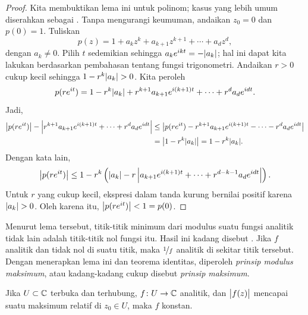 \begin{proof}
Kita membuktikan lema ini untuk polinom; kasus yang lebih umum diserahkan sebagai
.
Tanpa mengurangi keumuman, andaikan $z_0 = 0$ dan $p(0) = 1$.  Tuliskan
\begin{equation*}
p(z) = 1+a_kz^k + a_{k+1}z^{k+1} + \cdots + a_d z^d ,
\end{equation*}
dengan $a_k \neq 0$.  Pilih $t$ sedemikian sehingga $a_k e^{ikt} = -\lvert {a_k} \rvert$; hal
ini dapat kita lakukan berdasarkan pembahasan tentang fungsi trigonometri.  Andaikan
$r > 0$ cukup kecil sehingga
$1-r^k \lvert {a_k} \rvert > 0$.  Kita peroleh
\begin{equation*}
p(r e^{it}) =
1-r^k \lvert {a_k} \rvert + r^{k+1}a_{k+1}e^{i(k+1)t} + \cdots + r^{d}a_{d}e^{idt} .
\end{equation*}
Jadi,
\begin{equation*}
\begin{split}
\bigl\lvert {
p(r e^{it}) } \bigr\rvert - \left\lvert {
r^{k+1}a_{k+1}e^{i(k+1)t} + \cdots + r^{d}a_{d}e^{idt}
} \right\rvert
&
\leq
\bigl\lvert {
p(r e^{it}) 
- r^{k+1}a_{k+1}e^{i(k+1)t} - \cdots - r^{d}a_{d}e^{idt}
} \bigr\rvert
\\
&
=
\bigl\lvert {
1-r^k \lvert {a_k} \rvert
} \bigr\rvert
=
1-r^k \lvert {a_k} \rvert .
\end{split}
\end{equation*}
Dengan kata lain,
\begin{equation*}
\bigl\lvert {
p(r e^{it}) } \bigr\rvert
\leq
1-r^k \left( \lvert {a_k} \rvert
-
r
\left\lvert {
a_{k+1}e^{i(k+1)t} + \cdots + r^{d-k-1}a_{d}e^{idt}
} \right\rvert
\right) .
\end{equation*}
Untuk $r$ yang cukup kecil, ekspresi dalam tanda kurung bernilai positif
karena $\lvert {a_k} \rvert > 0$.  Oleh karena itu, $\bigl\lvert {p(re^{it})} \bigr\rvert < 1 = p(0)$.
\end{proof}

Menurut lema tersebut, titik-titik minimum dari modulus suatu fungsi analitik
tidak lain adalah titik-titik nol fungsi itu.
Hasil ini kadang disebut \emph{}.
Jika $f$ analitik dan tidak nol di suatu titik,
maka $\nicefrac{1}{f}$ analitik di sekitar titik tersebut.  Dengan menerapkan lema ini dan
teorema identitas, diperoleh \emph{prinsip modulus maksimum}, atau kadang-kadang
cukup disebut \emph{prinsip maksimum}.

\begin{thm}%
%
\label{thm:maxprinciple}
Jika $U \subset {\mathbb{C}}$ terbuka dan terhubung,
$f \colon U \to {\mathbb{C}}$ analitik, dan $\bigl\lvert {f(z)} \bigr\rvert$ mencapai suatu
maksimum relatif di $z_0 \in U$, maka $f$ konstan.
\end{thm}

